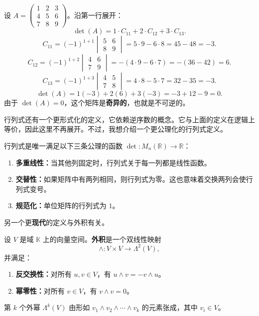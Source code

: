 \begin{example}
设 $A=\begin{pmatrix}1&2&3\\4&5&6\\7&8&9\end{pmatrix}$。沿第一行展开：
\[ \det(A)=1\cdot C_{11}+2\cdot C_{12}+3\cdot C_{13}. \]
\[ C_{11}=(-1)^{1+1}\begin{vmatrix}5&6\\8&9\end{vmatrix}=5\cdot9-6\cdot8=45-48=-3. \]
\[ C_{12}=(-1)^{1+2}\begin{vmatrix}4&6\\7&9\end{vmatrix}=-(4\cdot9-6\cdot7)=-(36-42)=6. \]
\[ C_{13}=(-1)^{1+3}\begin{vmatrix}4&5\\7&8\end{vmatrix}=4\cdot8-5\cdot7=32-35=-3. \]
\[ \det(A)=1(-3)+2(6)+3(-3)=-3+12-9=0. \]
由于 $\det(A)=0$，这个矩阵是\textbf{奇异的}，也就是不可逆的。
\end{example}

行列式还有一个更形式化的定义，它依赖逆序数的概念。它与上面的定义在逻辑上等价，因此这里不再展开。不过，我想介绍一个更公理化的行列式定义。

\begin{definition}[行列式的公理化定义]
行列式是唯一满足以下三条公理的函数 $\det: M_n(\mathbb{R})\to\mathbb{R}$：
\begin{enumerate}
    \item \textbf{多重线性：}当其他列固定时，行列式关于每一列都是线性函数。
    \item \textbf{交替性：}如果矩阵中有两列相同，则行列式为零。这也意味着交换两列会使行列式变号。
    \item \textbf{规范化：}单位矩阵的行列式为 $1$。
\end{enumerate}
\end{definition}

另一个更\textbf{现代}的定义与外积有关。

\begin{definition}[外积]
设 $V$ 是域 $\mathbb{K}$ 上的向量空间。\textbf{外积}是一个双线性映射
\[
\wedge:V\times V\to \Lambda^2(V),
\]
并满足：
\begin{enumerate}
    \item \textbf{反交换性：}对所有 $u,v\in V$，有 $u\wedge v=-v\wedge u$。
    \item \textbf{幂零性：}对所有 $v\in V$，有 $v\wedge v=0$。
\end{enumerate}
第 $k$ 个外幂 $\Lambda^k(V)$ 由形如 $v_1\wedge v_2\wedge\cdots\wedge v_k$ 的元素张成，其中 $v_i\in V$。
\end{definition}

